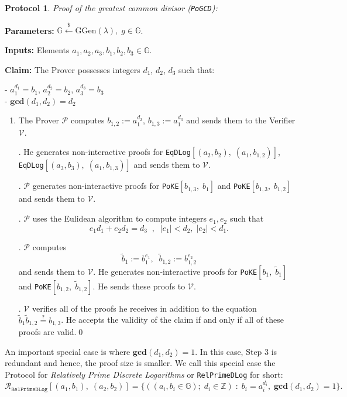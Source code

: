 \documentclass[11pt, lettersize, notitlepage, leqno, footskip=0.6cm]{article}
\newcommand{\bz}{\mathbb Z}
\newcommand{\ttt}{\texttt}
\newcommand{\wti}{\widetilde}
\newcommand{\mc}{\mathcal}
\newcommand{\mb}{\mathbb}
\newcommand{\mbf}{\mathbf}
\newcommand{\mr}{\mathrm}
\newcommand{\lamb}{\lambda}
\newcommand{\V}{\mc{V}}
\newcommand{\vs}{\vspace{-0.15cm}}
\newcommand{\GCD}{\mbf{gcd}}
\newtheorem{Prot}[Thm]{Protocol}
\numberwithin{equation}{section}
\begin{document}
\begin{Prot} \normalfont \textit{Proof of the greatest common divisor} (\verb|PoGCD|):\end{Prot} \vspace{-0.3cm}

\noindent \textbf{Parameters:} $\mb{G}\xleftarrow{\$} \mr{GGen}(\lamb), \; g\in \mb{G}$.

\noindent \textbf{Inputs:} Elements $a_1, a_2, a_3, b_1, b_2, b_3 \in \mb{G}$.

\noindent \textbf{Claim:} The Prover possesses integers $d_1$, $d_2$, $d_3$ such that:

\noindent - $a_1^{d_1} = b_1$, $a_2^{d_2} = b_2$, $a_3^{d_3} = b_3$\\
\noindent - $\GCD(d_1, d_2) = d_2$
 

\begin{enumerate}[wide, labelwidth=!, labelindent=0pt]\vs \item The Prover $\mc{P}$ computes $b_{1,2}:= a_1^{d_2}$, $b_{1,3}:= a_1^{d_3}$ and sends them to the Verifier $\V$.

. He generates non-interactive proofs for \verb|EqDLog|$[(a_2, b_2),\; (a_1, b_{1,2})]$, \verb|EqDLog|$[(a_3, b_3),\; (a_1, b_{1,3})]$ and sends them to $\mc{V}$.

. $\mc{P}$ generates non-interactive proofs for \verb|PoKE|$[b_{1,3},\;b_1 ]$ and \verb|PoKE|$[b_{1,3},\;b_{1,2} ]$ and sends them to $\V$.

. $\mc{P}$ uses the Eulidean algorithm to compute integers $e_1, e_2$ such that \vs $$e_1d_1 + e_2d_2 = d_3\;\;,\;\; |e_1| < d_2,\; |e_2| < d_1 .$$

. $\mc{P}$ computes \vs $$\wti{b}_1:= b_1^{e_1},\;\; \wti{b}_{1,2}:= b_{1,2}^{e_2} $$ and sends them to $\V$. He generates non-interactive proofs for \verb|PoKE|$[b_1,\; \wti{b}_1]$ and \verb|PoKE|$[b_{1,2},\; \wti{b}_{1,2}]$. He sends these proofs to $\mc{V}$.

. $\mc{V}$ verifies all of the proofs he receives in addition to the equation $\wti{b}_1\wti{b}_{1,2}\stackrel{?}{=} b_{1,3}$. He accepts the validity of the claim if and only if all of these proofs are valid.\qed \end{enumerate}

\noindent An important special case is where $\GCD(d_1, d_2) = 1$. In this case, Step 3 is redundant and hence, the proof size is smaller. We call this special case the Protocol for \textit{Relatively Prime Discrete Logarithms} or \verb|RelPrimeDLog| for short: $$\mc{R}_{{\ttt{RelPrimeDLog}}}[(a_1,b_1),\;(a_2,b_2)] = \{((a_i, b_i\in\mb{G});\;d_i\in\bz)\;:\; b_i = a_i^{d_i},\;\GCD(d_1,d_2)=1 \} .$$ 
\end{document}
